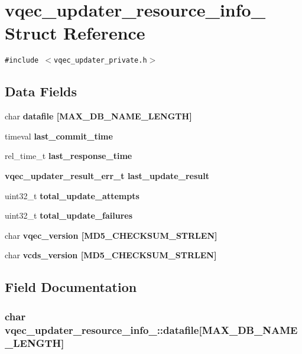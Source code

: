 \section{vqec\_\-updater\_\-resource\_\-info\_\- Struct Reference}
\label{structvqec__updater__resource__info__}
{\tt \#include $<$vqec\_\-updater\_\-private.h$>$}

\subsection*{Data Fields}
\begin{CompactItemize}
\item 
char \bf{datafile} [MAX\_\-DB\_\-NAME\_\-LENGTH]
\item 
timeval \bf{last\_\-commit\_\-time}
\item 
rel\_\-time\_\-t \bf{last\_\-response\_\-time}
\item 
\bf{vqec\_\-updater\_\-result\_\-err\_\-t} \bf{last\_\-update\_\-result}
\item 
uint32\_\-t \bf{total\_\-update\_\-attempts}
\item 
uint32\_\-t \bf{total\_\-update\_\-failures}
\item 
char \bf{vqec\_\-version} [MD5\_\-CHECKSUM\_\-STRLEN]
\item 
char \bf{vcds\_\-version} [MD5\_\-CHECKSUM\_\-STRLEN]
\end{CompactItemize}


\subsection{Field Documentation}
\subsubsection{\setlength{\rightskip}{0pt plus 5cm}char \bf{vqec\_\-updater\_\-resource\_\-info\_\-::datafile}[MAX\_\-DB\_\-NAME\_\-LENGTH]}\label{structvqec__updater__resource__info___162382a0192c71142202a345abf01b07}


